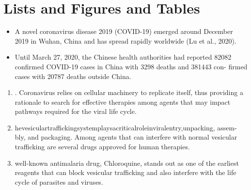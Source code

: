 \documentclass{article}
\begin{document}
\section{Lists and Figures and Tables}
\begin{itemize}
\item A novel coronavirus disease 2019 (COVID-19) emerged around December
2019 in Wuhan, China and has spread rapidly worldwide (Lu et al., 2020).
\item Until March 27, 2020, the Chinese health authorities had reported 82082
confirmed COVID-19 cases in China with 3298 deaths and 381443 con-
firmed cases with 20787 deaths outside China.
\end{itemize} 
\begin{enumerate}
\item . Coronavirus relies on cellular machinery to replicate itself, thus providing
a rationale to search for effective therapies among agents that may impact
pathways required for the viral life cycle.
\item  hevesiculartraffickingsystemplaysacriticalroleinviralentry,unpacking, assem-
bly, and packaging. Among agents that can interfere with normal vesicular
trafficking are several drugs approved for human therapies.
\item well-known antimalaria drug, Chloroquine, stands out as one of the earliest
reagents that can block vesicular trafficking and also interfere with the life
cycle of parasites and viruses.
\end{enumerate}

\\
\end{document}
